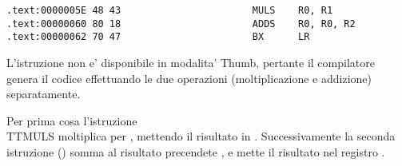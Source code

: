 \subsectionold{\OptimizingKeilVI (\ThumbMode)}

\begin{lstlisting}[label=ARM_leaf_example2]
.text:0000005E 48 43                       MULS    R0, R1
.text:00000060 80 18                       ADDS    R0, R0, R2
.text:00000062 70 47                       BX      LR
\end{lstlisting}

L'istruzione  non e' disponibile in modalita' Thumb, pertante il compilatore genera il codice effettuando le due operazioni 
(moltiplicazione e addizione) separatamente.

Per prima cosa l'istruzione \\TT{MULS} moltiplica  per , mettendo il risultato in .
Successivamente la seconda istruzione () somma al risultato precendete , e mette il risultato nel registro .
